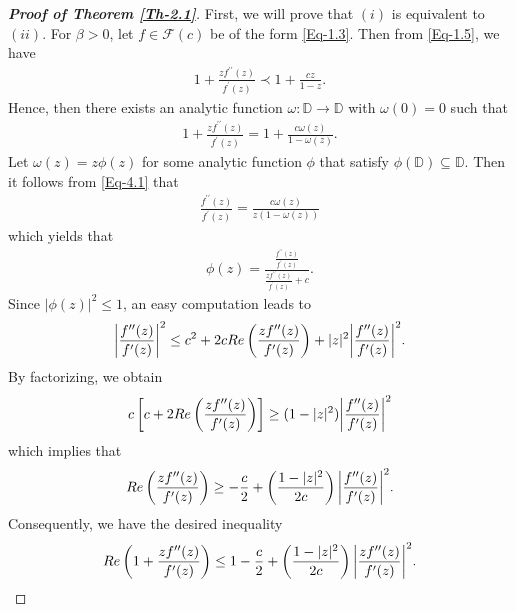 \documentclass[10pt,a4paper]{amsart}
\begin{document}
\begin{proof}[\bf Proof of Theorem \ref{Th-2.1}]
	First, we will prove that $(i)$ is equivalent to $(ii)$. For $\beta>0$, let  $f\in\mathcal{F}(c)$ be of the form \eqref{Eq-1.3}. Then from \eqref{Eq-1.5}, we have
	\begin{align}\label{Eq-4.1}
		1+\frac{zf^{\prime\prime}(z)} {f^{\prime}(z)}\prec1+\frac{cz}{1-z}.
	\end{align}
	\noindent Hence, then there exists an analytic function $\omega: \mathbb{D}\rightarrow\mathbb{D}$ with $\omega(0)=0$ such that
	\begin{align*}
		1+\frac{zf^{\prime\prime}(z)} {f^{\prime}(z)}=1+\frac{c\omega(z)}{1-\omega(z)}.
	\end{align*}
	Let $\omega(z)=z\phi(z)$ for some analytic function $\phi$ that satisfy $\phi(\mathbb{D})\subseteq\mathbb{D}$. Then it follows from \eqref{Eq-4.1} that
	\begin{align*}
		\frac{f^{\prime\prime}(z)}{f^{\prime}(z)}=\frac{c\omega(z)}{z(1-\omega(z))}
	\end{align*}
	which yields that
	\begin{align}\label{Eq-2.3}
		\phi(z)=\frac{\frac{f^{\prime\prime}(z)}{f^{\prime}(z)}}{\frac{zf^{\prime\prime}(z)}{f^{\prime}(z)}+c}.
	\end{align}
	Since $|\phi(z)|^2\leq1$, an easy computation leads to
	\begin{align}\label{Eq-2.4}
		\bigg|\frac{f^{\prime\prime}(z)}{f^{\prime}(z)}\bigg|^2\leq c^2+2c	{\rm Re}\left(\frac{zf^{\prime\prime}(z)}{f^{\prime}(z)}\right)+|z|^2\bigg|\frac{f^{\prime\prime}(z)}{f^{\prime}(z)}\bigg|^2.
	\end{align}
	By factorizing, we obtain
	\begin{align*}
		\nonumber c\left[c+2{\rm Re}\left(\frac{zf^{\prime\prime}(z)}{f^{\prime}(z)}\right)\right]\ge(1-|z|^2)\bigg|\frac{f^{\prime\prime}(z)}{f^{\prime}(z)}\bigg|^2
	\end{align*}
	which implies that
	\begin{align}
		{\rm Re}\left(\frac{zf^{\prime\prime}(z)}{f^{\prime}(z)}\right)\geq-\frac{c}{2}+\left(\frac{1-|z|^2}{2c}\right)\bigg|\frac{f^{\prime\prime}(z)}{f^{\prime}(z)}\bigg|^2.
	\end{align}
	Consequently, we have the desired inequality
	\begin{align*}
		{\rm Re  }\left(1+\frac{zf^{\prime\prime}(z)}{f^{\prime}(z)}\right)\leq1-\frac{c}{2}+\left(\frac{1-|z|^2}{2c}\right)\bigg|\frac{zf^{\prime\prime}(z)}{f^{\prime}(z)}\bigg|^2.
	\end{align*}
	

\end{proof}
\end{document}
